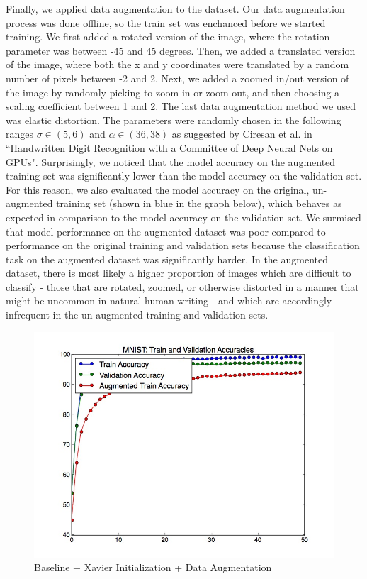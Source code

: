 \documentclass[a4paper]{article}
\begin{document}
\begin{enumerate}
{Finally, we applied data augmentation to the dataset. Our data augmentation process was done offline, so the train set was enchanced before we started training. We first added a rotated version of the image, where the rotation parameter was between -45 and 45 degrees. Then, we added a translated version of the image, where both the x and y coordinates were translated by a random number of pixels between -2 and 2. Next, we added a zoomed in/out version of the image by randomly picking to zoom in or zoom out, and then choosing a scaling coefficient between 1 and 2. The last data augmentation method we used was elastic distortion. The parameters were randomly chosen in the following ranges $\sigma \in (5,6)$ and $\alpha \in (36,38)$ as suggested by Ciresan et al. in ``Handwritten Digit Recognition with a Committee of Deep Neural Nets on GPUs".
\newline
\newline
Surprisingly, we noticed that the model accuracy on the augmented training set was significantly lower than the model accuracy on the validation set. For this reason, we also evaluated the model accuracy on the original, un-augmented training set (shown in blue in the graph below), which behaves as expected in comparison to the model accuracy on the validation set. We surmised that model performance on the augmented dataset was poor compared to performance on the original training and validation sets because the classification task on the augmented dataset was significantly harder. In the augmented dataset, there is most likely a higher proportion of images which are difficult to classify - those that are rotated, zoomed, or otherwise distorted in a manner that might be uncommon in natural human writing - and which are accordingly infrequent in the un-augmented training and validation sets. 

\begin{figure}
  \includegraphics[width=12cm]{../plots/accuracies_augmented.jpg}
  \centering
  \caption{Baseline + Xavier Initialization + Data Augmentation}
  \label{fig:boat1}
\end{figure}

}
\end{enumerate}
\end{document}
